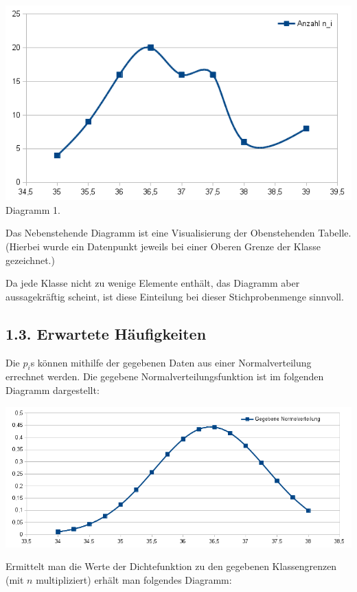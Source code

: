 \documentclass[12pt,a4paper]{article}
\begin{document}
\noindent
\begin{minipage}{0.6\textwidth}
\includegraphics[scale=0.56]{1_2_diagram}
Diagramm 1.
\\
\end{minipage}
\begin{minipage}{0.4\textwidth}
Das Nebenstehende Diagramm ist eine Visualisierung der Obenstehenden Tabelle. (Hierbei wurde ein Datenpunkt jeweils bei einer Oberen Grenze der Klasse gezeichnet.)

Da jede Klasse nicht zu wenige Elemente enthält, das Diagramm aber aussagekräftig scheint, ist diese Einteilung bei dieser Stichprobenmenge sinnvoll.
\end{minipage}

\subsection*{1.3. Erwartete Häufigkeiten}
Die $p_i$s können mithilfe der gegebenen Daten aus einer Normalverteilung errechnet werden. Die gegebene Normalverteilungsfunktion ist im folgenden Diagramm dargestellt:

\includegraphics[scale=0.7]{1_3_normvert}

Ermittelt man die Werte der Dichtefunktion zu den gegebenen Klassengrenzen (mit $n$ multipliziert) erhält man folgendes Diagramm:
\end{document}
